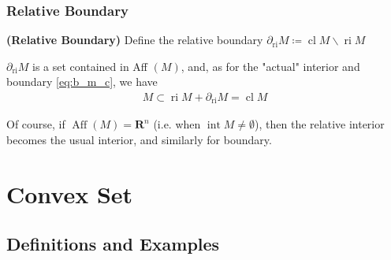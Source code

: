 \documentclass{article}
\newcommand{\bfs}[1]{\textbf{({#1}) }}
\newcommand{\ri}{\operatorname{ri}}
\newcommand{\inte}{\operatorname{int}}
\newcommand{\Aff}{\operatorname{Aff}}
\begin{document}
\subsubsection{Relative Boundary}
\begin{defa}{\bfs{Relative Boundary}}
 Define the relative boundary $\partial_{\mathrm{ri}} M\coloneqq\operatorname{cl} M \backslash \ri M$ 
 \end{defa}
$\partial_{\mathrm{ri}} M$ is a  set contained in Aff $(M)$, and, as for the "actual" interior and boundary \cref{eq:b_m_c}, we have
\begin{align*}
 M \subset \operatorname{ri} M+\partial_{\mathrm{ri}} M = \operatorname{cl} M
\end{align*}
\begin{rema}
Of course, if  $\Aff(M)=\mathbf{R}^{n}$ (i.e. when $\inte M \neq \emptyset$), then the relative interior becomes the usual interior, and similarly for boundary.
\end{rema}




\section{Convex Set}
\subsection{Definitions and Examples}
\end{document}
